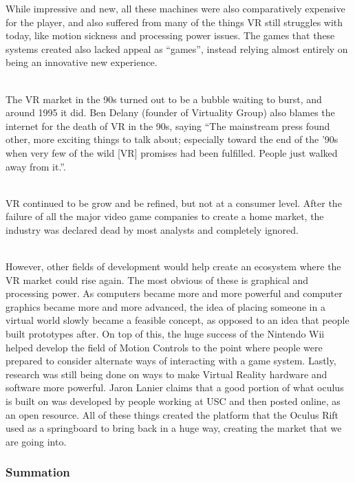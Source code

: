 \documentclass[a4paper,10pt]{article}
\begin{document}
	While impressive and new, all these machines were also comparatively expensive for the player, and also suffered from many of the things VR still struggles with today, like motion sickness and processing power issues.  The games that these systems created also lacked appeal as “games”, instead relying almost entirely on being an innovative new experience.  
		\par ~\\
	The VR market in the 90s turned out to be a bubble waiting to burst, and around 1995 it did.  Ben Delany (founder of Virtuality Group) also blames the internet for the death of VR in the 90s, saying “The mainstream press found other, more exciting things to talk about; especially toward the end of the ’90s when very few of the wild [VR] promises had been fulfilled. People just walked away from it.”.\cite{vergeVr}
			\par ~\\
	VR continued to be grow and be refined, but not at a consumer level.  After the failure of all the major video game companies to create a home market, the industry was declared dead by most analysts and completely ignored.  
		\par ~\\
	However, other fields of development would help create an ecosystem where the VR market could rise again.  The most obvious of these is graphical and processing power.  As computers became more and more powerful and computer graphics became more and more advanced, the idea of placing someone in a virtual world slowly became a feasible concept, as opposed to an idea that people built prototypes after.  On top of this, the huge success of the Nintendo Wii helped develop the field of Motion Controls to the point where people were prepared to consider alternate ways of interacting with a game system.  Lastly, research was still being done on ways to make Virtual Reality hardware and software more powerful.  Jaron Lanier claims that a good portion of what oculus is built on was developed by people working at USC and then posted online, as an open resource.\cite{verge}  All of these things created the platform that the Oculus Rift used as a springboard to bring back in a huge way, creating the market that we are going into.
	\subsubsection{Summation}
	
\end{document}
